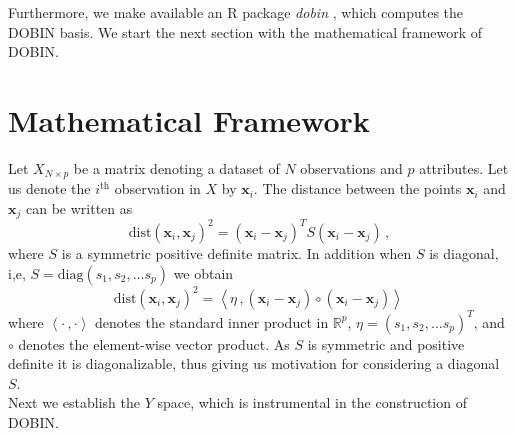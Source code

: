 \documentclass[11pt]{article}
\newcommand{\dist}{\text{dist}}
\newcommand{\diag}{\text{diag}}
\begin{document}
Furthermore, we make available an R package \textit{dobin} \citep{dobin}, which computes the DOBIN basis. We start the next section  with the mathematical framework of DOBIN. %


\section{Mathematical Framework}\label{sec:MathFrame}
Let $X_{N \times p}$ be a matrix denoting a dataset of $N$ observations and $p$ attributes. Let us denote the  $i^{\text{th}}$ observation in $X$ by $\bm{x}_i$. The  distance between the points $\bm{x}_i$ and $\bm{x}_j$  can be written as 
\begin{equation}\label{eq:secMF1}
\dist(\bm{x}_i, \bm{x}_j)^2 = \left( \bm{x}_i - \bm{x}_j \right)^T S \left( \bm{x}_i - \bm{x}_j \right) \, , 
\end{equation}
where $S$ is a symmetric positive definite matrix.  In addition when $S$ is diagonal, i,e, $S = \diag(s_1, s_2, \ldots s_p)$ we obtain
\begin{equation}\label{eq:secMF2}
    \dist(\bm{x}_i, \bm{x}_j)^2 = \left\langle \eta\, ,  \left( \bm{x}_i - \bm{x}_j \right)\circ \left( \bm{x}_i - \bm{x}_j \right)  \right\rangle\, 
\end{equation}
where $\left\langle \cdot\, , \cdot \right\rangle$ denotes the standard inner product in $\mathbb{R}^p$,   $\eta = \left(s_1, s_2, \ldots s_p\right)^T$, and $\circ$ denotes the element-wise  vector product. As $S$ is symmetric and positive definite  it is diagonalizable, thus giving us motivation for considering a diagonal $S$.  \\

\noindent
Next we establish the $Y$ space, which is instrumental in the construction of DOBIN.
\end{document}
